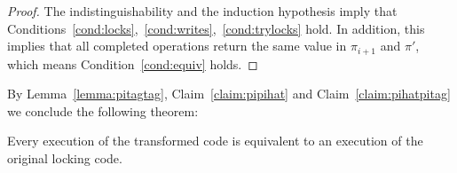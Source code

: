 \begin{proof}
The indistinguishability and the induction hypothesis imply that Conditions~\ref{cond:locks},~\ref{cond:writes},~\ref{cond:trylocks} hold.
In addition, this implies that all completed operations return the same value in $\pi_{i+1}$ and $\pi'$, which
means Condition~\ref{cond:equiv} holds.

\end{proof}

By Lemma~\ref{lemma:pitagtag}, Claim~\ref{claim:pipihat} and Claim~\ref{claim:pihatpitag} we conclude the following
theorem:
\begin{theorem}
Every execution of the transformed code is equivalent to an
execution of the original locking code.
\end{theorem}
